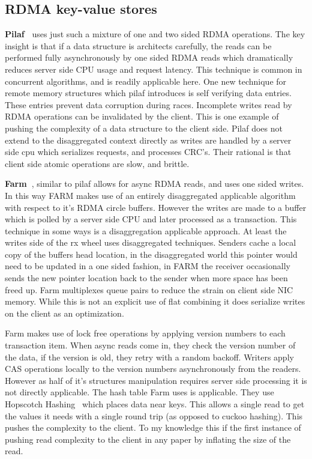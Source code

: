 \subsection{RDMA key-value stores} 
\textbf{Pilaf~\cite{pilaf}} uses just such a mixture of one and two sided RDMA
operations. The key insight is that if a data structure is architects carefully,
the reads can be performed fully asynchronously by one sided RDMA reads which
dramatically reduces server side CPU usage and request latency. This technique
is common in concurrent algorithms, and is readily applicable here. One new
technique for remote memory structures which pilaf introduces is self verifying
data entries. These entries prevent data corruption during races. Incomplete
writes read by RDMA operations can be invalidated by the client. This is one
example of pushing the complexity of a data structure to the client side. Pilaf
does not extend to the disaggregated context directly as writes are handled by a
server side cpu which serializes requests, and processes CRC's. Their rational
is that client side atomic operations are slow, and brittle. 


\textbf{Farm~\cite{farm}}, similar to pilaf allows for async RDMA reads, and
uses one sided writes. In this way FARM makes use of an entirely disaggregated
applicable algorithm with respect to it's RDMA circle buffers. 
However the writes are made to a buffer which is polled by a server side CPU and
later processed as a transaction. This technique in some ways is a
disaggregation applicable approach. At least the writes side of the rx wheel
uses disaggregated techniques. Senders cache a local copy of the buffers head
location, in the disaggregated world this pointer would need to be updated in a
one sided fashion, in FARM the receiver occasionally sends the new pointer
location back to the sender when more space has been freed up.
Farm multiplexes queue pairs to reduce the strain on client side NIC memory.
While this is not an explicit use of flat combining it does serialize writes on
the client as an optimization.

Farm makes use of lock free operations by applying version numbers to each
transaction item. When async reads come in, they check the version number of the
data, if the version is old, they retry with a random backoff. Writers apply CAS
operations locally to the version numbers asynchronously from the readers.
However as half of it's structures manipulation requires server side processing
it is not directly applicable. The hash table Farm uses is applicable. They use
Hopscotch Hashing~\cite{hopscotch} which places data near keys. This allows a
single read to get the values it needs with a single round trip (as opposed to
cuckoo hashing). This pushes the complexity to the client. To my knowledge this
if the first instance of pushing read complexity to the client in any paper by
inflating the size of the read.


